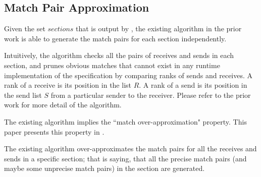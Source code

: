 \subsection{Match Pair Approximation}

Given the set $\mathit{sections}$ that is output by , the existing algorithm in the prior work \cite{DBLP:conf/kbse/HuangMM13} is able to generate the match pairs for each section independently. 

Intuitively, the algorithm checks all the pairs of receives and sends in each section, and prunes obvious matches that cannot exist in any runtime implementation of the specification by comparing ranks of sends and receives. 
A rank of a receive is its position in the list $R$. 
A rank of a send is its position in the send list $S$ from a particular sender to the receiver.    
Please refer to the prior work \cite{DBLP:conf/kbse/HuangMM13} for more detail of the algorithm. 


The existing algorithm implies the ``match over-approximation" property. This paper presents this property in . 

\begin{lemma}
The existing algorithm \cite{DBLP:conf/kbse/HuangMM13} over-approximates the match pairs for all the receives and sends in a specific section; that is saying, that all the precise match pairs (and maybe some unprecise match pairs) in the section are generated.
\label{lemma:match}
\end{lemma}



